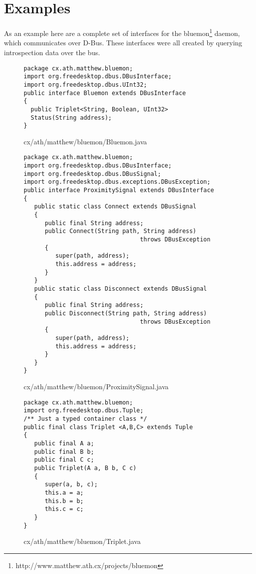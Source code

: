 \documentclass[a4paper,12pt]{article}
\begin{document}
\section{Examples}

As an example here are a complete set of interfaces for the
bluemon\footnote{http://www.matthew.ath.cx/projects/bluemon} daemon,
which communicates over D-Bus. These interfaces were all created by
querying introspection data over the bus.

\newpage

\begin{figure}[!h]
\begin{center}
\begin{verbatim}
package cx.ath.matthew.bluemon;
import org.freedesktop.dbus.DBusInterface;
import org.freedesktop.dbus.UInt32;
public interface Bluemon extends DBusInterface
{
  public Triplet<String, Boolean, UInt32> 
  Status(String address);
}
\end{verbatim}
\end{center}
\caption{cx/ath/matthew/bluemon/Bluemon.java}
\end{figure}

\newpage

\begin{figure}[!h]
\begin{center}
\begin{verbatim}
package cx.ath.matthew.bluemon;
import org.freedesktop.dbus.DBusInterface;
import org.freedesktop.dbus.DBusSignal;
import org.freedesktop.dbus.exceptions.DBusException;
public interface ProximitySignal extends DBusInterface
{
   public static class Connect extends DBusSignal
   {
      public final String address;
      public Connect(String path, String address) 
                                 throws DBusException
      {
         super(path, address);
         this.address = address;
      }
   }
   public static class Disconnect extends DBusSignal
   {
      public final String address;
      public Disconnect(String path, String address)
                                 throws DBusException
      {
         super(path, address);
         this.address = address;
      }
   }
}
\end{verbatim}
\end{center}
\caption{cx/ath/matthew/bluemon/ProximitySignal.java}
\end{figure}

\newpage

\begin{figure}[!h]
\begin{center}
\begin{verbatim}
package cx.ath.matthew.bluemon;
import org.freedesktop.dbus.Tuple;
/** Just a typed container class */
public final class Triplet <A,B,C> extends Tuple
{
   public final A a;
   public final B b;
   public final C c;
   public Triplet(A a, B b, C c)
   {
      super(a, b, c);
      this.a = a;
      this.b = b;
      this.c = c;
   }
}
\end{verbatim}
\end{center}
\caption{cx/ath/matthew/bluemon/Triplet.java}
\end{figure}
\end{document}
